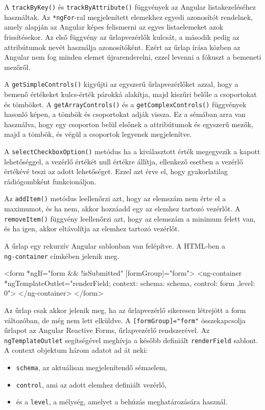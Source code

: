 A \texttt{trackByKey()} és \texttt{trackByAttribute()} függvények az Angular listakezeléséhez használtak. Az \texttt{*ngFor}-ral megjelenített elemekhez egyedi azonosítót rendelnek, amely alapján az Angular képes felismerni az egyes listaelemeket azok frissítésekor. Az első függvény az űrlapvezérlők kulcsát, a második pedig az attribútumok nevét használja azonosítóként. Ezért az űrlap írása közben az Angular nem fog minden elemet újrarenderelni, ezzel levenni a fókuszt a bemeneti mezőről.

A \texttt{getSimpleControls()} kigyűjti az egyszerű űrlapvezérlőket azzal, hogy a bemenő értékeket kulcs-érték párokká alakítja, majd kiszűri belőle a csoportokat és tömböket. A \texttt{getArrayControls()} és a \texttt{getComplexControls()} függvények hasonló képen, a tömbök és csoportokat adják vissza. Ez a sémában arra van használva, hogy egy csoporton belül elsőnek a attribútumok és egyszerű mezők, majd a tömbök, és végül a csoportok legyenek megjelenítve.

A \texttt{selectCheckboxOption()} metódus ha a kiválasztott érték megegyezik a kapott lehetőséggel, a vezérlő értékét null értékre állítja, ellenkező esetben a vezérlő értékévé teszi az adott lehetőséget. Ezzel azt érve el, hogy gyakorlatilag rádiógombként funkcionáljon.

Az \texttt{addItem()} metódus leellenőrzi azt, hogy az elemszám nem érte el a maximumot, és ha nem, akkor hozzáadd egy az elemhez tartozó vezérlőt. A \texttt{removeItem()} függvény leellenőrzi azt, hogy az elemszám a minimum felett van, és ha igen, akkor eltávolítja az elemhez tartozó vezérlőt.

A űrlap egy rekurzív Angular sablonban van felépítve. A HTML-ben a \\ \texttt{ng-container} címkében jelenik meg.

\begin{java}
<form *ngIf="form && !isSubmitted" [formGroup]="form">
  <ng-container *ngTemplateOutlet="renderField; 
    context: { schema: schema, control: form ,level: 0}">
  </ng-container>
</form>
\end{java}
Az űrlap csak akkor jelenik meg, ha az űrlapvezérlő sikeresen létrejött a form változóban, de még nem lett elküldve. A \texttt{[formGroup]="form"} összekapcsolja űrlapot az Angular Reactive Forms, űrlapvezérlő rendszerével. Az \texttt{ngTemplateOutlet} segítségével meghívja a később definiált \texttt{renderField} sablont. A context objektum három adatot ad át neki:
\begin{itemize}
\item \texttt{schema}, az aktuálisan megjelenítendő sémaelem,
\item \texttt{control}, ami az adott elemhez definiált vezérlő,
\item és a \texttt{level}, a mélység, amelyet a behúzás meghatározására használ.
\end{itemize}

